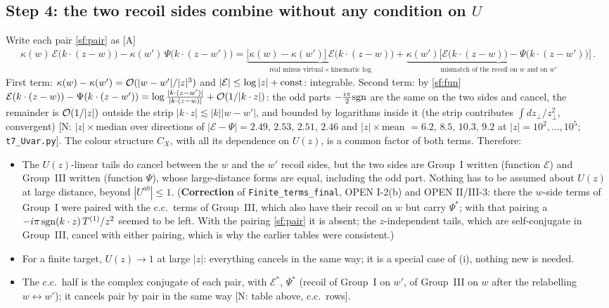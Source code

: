 \subsection{Step 4: the two recoil sides combine without any condition on $U$}
\noindent Write each pair \eqref{sf:pair} as [A]
\begin{align}
\kappa(w)\,\mathcal{E}\big(k\cdot(z-w)\big)-\kappa(w')\,\Psi\big(k\cdot(z-w')\big)=\underbrace{\big[\kappa(w)-\kappa(w')\big]\,\mathcal{E}\big(k\cdot(z-w)\big)}_{\text{real minus virtual}\,\times\,\text{kinematic log}}+\underbrace{\kappa(w')\Big[\mathcal{E}\big(k\cdot(z-w)\big)-\Psi\big(k\cdot(z-w')\big)\Big]}_{\text{mismatch of the recoil on $w$ and on $w'$}}\,.\label{sf:rmv}
\end{align}
First term: $\kappa(w)-\kappa(w')={\cal O}(|w-w'|/|z|^{3})$ and $|\mathcal{E}|\le\log|z|+{\rm const}$: integrable. Second term: by \eqref{sf:fun} $\mathcal{E}(k\cdot(z-w))-\Psi(k\cdot(z-w'))=\log\frac{|k\cdot(z-w')|}{|k\cdot(z-w)|}+{\cal O}(1/|k\cdot z|)$: the odd parts $-\frac{i\pi}{2}{\rm sgn}$ are the same on the two sides and cancel, the remainder is ${\cal O}(1/|z|)$ outside the strip $|k\cdot z|\lesssim|k||w-w'|$, and bounded by logarithms inside it (the strip contributes $\int dz_{\perp}/z_{\perp}^{2}$, convergent) [N: $|z|\times$median over directions of $|\mathcal{E}-\Psi|=2.49,\,2.53,\,2.51,\,2.46$ and $|z|\times$mean $=6.2,\,8.5,\,10.3,\,9.2$ at $|z|=10^{2},\dots,10^{5}$; \texttt{t7\_Uvar.py}]. The colour structure $C_{X}$, with all its dependence on $U(z)$, is a common factor of both terms. Therefore:
\begin{itemize}
\item[(i)] The $U(z)$-linear tails do cancel between the $w$ and the $w'$ recoil sides, but the two sides are Group~I written (function $\mathcal{E}$) and Group~III written (function $\Psi$), whose large-distance forms are equal, including the odd part. Nothing has to be assumed about $U(z)$ at large distance, beyond $|U^{ab}|\le1$. (\textbf{Correction} of \texttt{Finite\_terms\_final}, OPEN I-2(b) and OPEN II/III-3: there the $w$-side terms of Group~I were paired with the c.c.\ terms of Group~III, which also have their recoil on $w$ but carry $\Psi^{*}$; with that pairing a $-i\pi\,{\rm sgn}(k\cdot z)\,T^{(1)}/z^{2}$ seemed to be left. With the pairing \eqref{sf:pair} it is absent; the $z$-independent tails, which are self-conjugate in Group~III, cancel with either pairing, which is why the earlier tables were consistent.)
\item[(ii)] For a finite target, $U(z)\to1$ at large $|z|$: everything cancels in the same way; it is a special case of (i), nothing new is needed.
\item[(iii)] The c.c.\ half is the complex conjugate of each pair, with $\mathcal{E}^{*}$, $\Psi^{*}$ (recoil of Group~I on $w'$, of Group~III on $w$ after the relabelling $w\leftrightarrow w'$); it cancels pair by pair in the same way [N: table above, c.c.\ rows].
\end{itemize}

